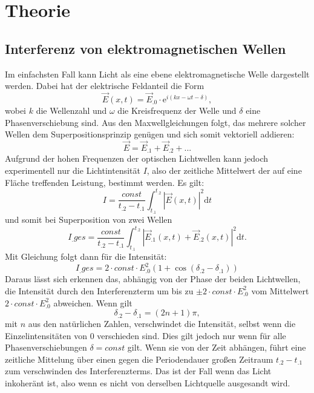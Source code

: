 \section{Theorie}
\label{sec:Theorie}

\subsection{Interferenz von elektromagnetischen Wellen}
Im einfachsten Fall kann Licht als eine ebene elektromagnetische Welle dargestellt werden. Dabei hat der elektrische Feldanteil die Form
\begin{equation}
\vec{E}(x,t)=\vec{E}_.0\cdot \mathrm{e}^{i\left(kx -\omega t -\delta\right)}\label{eq:Welle},
\end{equation}
wobei $k$ die Wellenzahl und $\omega$ die Kreisfrequenz der Welle und $\delta$ eine Phasenverschiebung sind.
Aus den Maxwellgleichungen folgt, das mehrere solcher Wellen dem Superpositionsprinzip genügen und sich somit vektoriell addieren:
\[
\vec{E}=\vec{E}_.1+\vec{E}_.2+\text{...}
\]
Aufgrund der hohen Frequenzen der optischen Lichtwellen kann jedoch experimentell nur die Lichtintensität $I$, also der zeitliche Mittelwert der auf eine Fläche treffenden Leistung, bestimmt werden.
Es gilt:
\[
I=\frac{const}{t_.2-t_.1}\int_{t_.1}^{t_.2}|\vec{E}(x,t)|^2\mathrm{d}t
\]
und somit bei Superposition von zwei Wellen
\begin{equation}
I_.{ges}=\frac{const}{t_.2-t_.1}\int_{t_.1}^{t_.2}|\vec{E}_.1(x,t)+\vec{E}_.2(x,t)|^2\mathrm{d}t \text{.}
\end{equation}
Mit Gleichung folgt dann für die Intensität:
\begin{equation}
I_.{ges}=2\cdot const\cdot E^2_.0(1+\cos(\delta_.2-\delta_.1))
\end{equation}
Daraus lässt sich erkennen das, abhängig von der Phase der beiden Lichtwellen, die Intensität durch den Interferenzterm um bis zu $\pm 2\cdot const\cdot E^2_.0$ vom Mittelwert $2\cdot const\cdot E^2_.0$ abweichen.
Wenn gilt
\[
\delta_.2-\delta_.1=(2n+1)\pi,
\]
mit $n$ aus den natürlichen Zahlen, verschwindet die Intensität, selbst wenn die Einzelintensitäten von $0$ verschieden sind.
Dies gilt jedoch nur wenn für alle Phasenverschiebungen $\delta=const$ gilt. Wenn sie von der Zeit abhängen, führt eine zeitliche Mittelung über einen gegen die Periodendauer großen Zeitraum $t_.2-t_.1$ zum verschwinden des Interferenzterms. Das ist der Fall wenn das Licht inkoheränt ist, also wenn es nicht von derselben Lichtquelle ausgesandt wird.\newline
